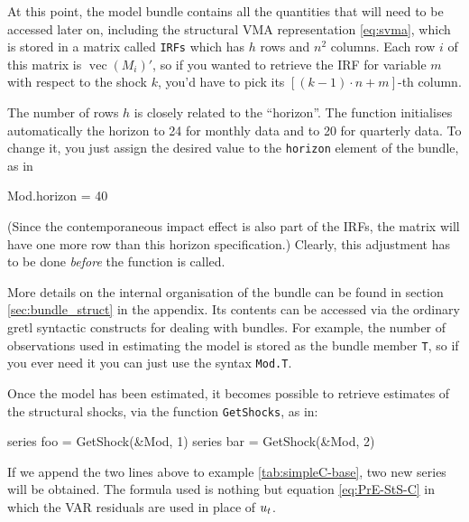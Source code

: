 \documentclass[a4paper,10pt]{article}
\newcommand{\app}[1]{\textsf{#1}}
\newcommand{\dtk}[1]{\texttt{\detokenize{#1}}}
\newcommand{\PrE}[1]{\ensuremath u_{#1}} %
\DeclareMathOperator{\VEC}{\mathrm{vec}}
\begin{document}
At this point, the model bundle contains all the quantities that will
need to be accessed later on, including the structural VMA
representation \eqref{eq:svma}, which is stored in a matrix called
\texttt{IRFs} which has $h$ rows and $n^2$ columns. Each row $i$ of
this matrix is $\VEC(M_i)'$, so if you wanted to retrieve the IRF for
variable $m$ with respect to the shock $k$, you'd have to pick its
$[(k-1)\cdot n + m]$-th column.

The number of rows $h$ is closely related to the ``horizon''. The function
\dtk{SVAR_setup} initialises automatically the horizon to 24 for
monthly data and to 20 for quarterly data. To change it, you just
assign the desired value to the \texttt{horizon} element of the
bundle, as in
\begin{code}
  Mod.horizon = 40
\end{code}
(Since the contemporaneous impact effect is also part of the IRFs, the 
matrix will have one more row than this horizon specification.)
Clearly, this adjustment has to be done \emph{before} the
\dtk{SVAR_estimate} function is called.
 
More details on the internal organisation of the bundle can be
found in section \ref{sec:bundle_struct} in the appendix. Its contents
can be accessed via the ordinary \app{gretl} syntactic constructs for
dealing with bundles. For example, the number of observations used in
estimating the model is stored as the bundle member \texttt{T}, so
if you ever need it you can just use the syntax \texttt{Mod.T}.

Once the model has been estimated, it becomes possible to retrieve
estimates of the structural shocks, via the function
\texttt{GetShocks}, as in:
\begin{code}
  series foo = GetShock(&Mod, 1)
  series bar = GetShock(&Mod, 2)
\end{code}
If we append the two lines above to example \ref{tab:simpleC-base},
two new series will be obtained. The formula used is nothing but
equation \eqref{eq:PrE-StS-C} in which the VAR residuals are used in
place of $\PrE{t}$.

\bigskip
\end{document}
